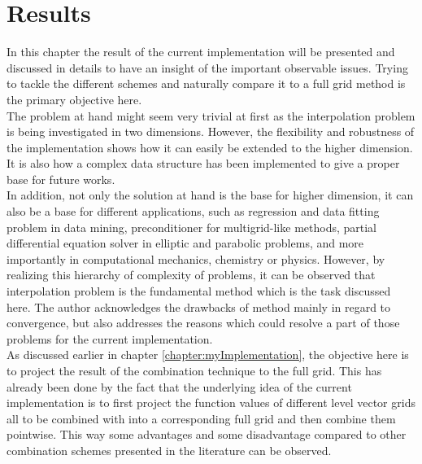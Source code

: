 \chapter{Results}
\label{chapter:results}
In this chapter the result of the current implementation will be presented and discussed in details to have an insight of the important observable issues. Trying to tackle the different schemes and naturally compare it to a full grid method is the primary objective here. \\

The problem at hand might seem very trivial at first as the interpolation problem is being investigated in two dimensions. However, the flexibility and robustness of the implementation shows how it can easily be extended to the higher dimension. It is also how a complex data structure has been implemented to give a proper base for future works.\\

In addition, not only the solution at hand is the base for higher dimension, it can also be a base for different applications, such as regression and data fitting problem in data mining, preconditioner for multigrid-like methods, partial differential equation solver in elliptic and parabolic problems, and more importantly in computational mechanics, chemistry or physics. However, by realizing this hierarchy of complexity of problems, it can be observed that interpolation problem is the fundamental method which is the task discussed here. The author acknowledges the drawbacks of method mainly in regard to convergence, but also addresses the reasons which could resolve a part of those problems for the current implementation.\\

As discussed earlier in chapter \ref{chapter:myImplementation}, the objective here is to project the result of the combination technique to the full grid. This has already been done by the fact that the underlying idea of the current implementation is to first project the function values of different level vector grids all to be combined with into a corresponding full grid and then combine them pointwise. This way some advantages and some disadvantage compared to other combination schemes presented in the literature can be observed. \\

